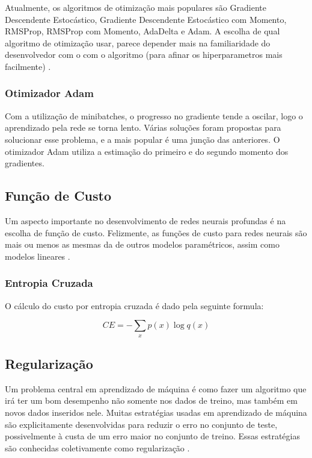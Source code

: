 \documentclass[12pt]{article}
\begin{document}
Atualmente, os algoritmos de otimização mais populares são Gradiente Descendente Estocástico, Gradiente Descendente Estocástico com Momento, RMSProp, RMSProp com Momento, AdaDelta e Adam. A escolha de qual algoritmo de otimização usar, parece depender mais na familiaridade do desenvolvedor com o com o algoritmo (para afinar os hiperparametros mais facilmente) \cite{Goodfellow-et-al-2016}.

\subsubsection{Otimizador Adam}

Com a utilização de minibatches, o progresso no gradiente tende a oscilar, logo o aprendizado pela rede se torna lento. Várias soluções foram propostas para solucionar esse problema, e a mais popular é uma junção das anteriores. O otimizador Adam \cite{DBLP:journals/corr/KingmaB14} utiliza a estimação do primeiro e do segundo momento dos gradientes.

\subsection{Função de Custo}

Um aspecto importante no desenvolvimento de redes neurais profundas é na escolha de função de custo. Felizmente, as funções de custo para redes neurais são mais ou menos as mesmas da de outros modelos paramétricos, assim como modelos lineares \cite{Goodfellow-et-al-2016}.

\subsubsection{Entropia Cruzada}

O cálculo do custo por entropia cruzada é dado pela seguinte formula:

\begin{equation}
    CE = -\sum\limits_{x} p(x)\log q(x)
\end{equation}

\subsection{Regularização}

Um problema central em aprendizado de máquina é como fazer um algoritmo que irá ter um bom desempenho não somente nos dados de treino, mas também em novos dados inseridos nele. Muitas estratégias usadas em aprendizado de máquina são explicitamente desenvolvidas para reduzir o erro no conjunto de teste, possivelmente à custa de um erro maior no conjunto de treino. Essas estratégias são conhecidas coletivamente como regularização \cite{Goodfellow-et-al-2016}.
\end{document}
